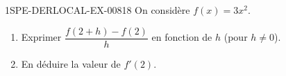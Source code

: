 \begin{exercice}{1SPE-DERLOCAL-EX-008}{1}{8}
On considère $f(x)=3x^2$.
\begin{enumerate}
  \item Exprimer $\dfrac{f(2+h)-f(2)}{h}$ en fonction de $h$ (pour $h\ne 0$).
  \item En déduire la valeur de $f'(2)$.
\end{enumerate}
\end{exercice}
